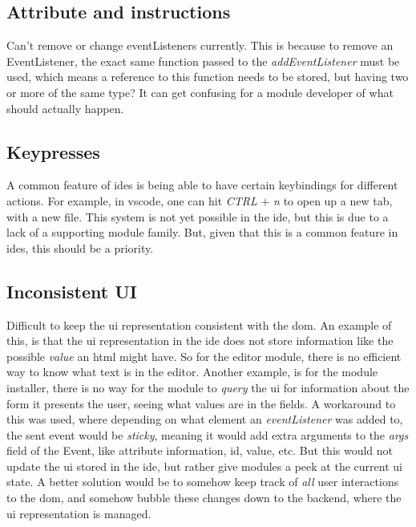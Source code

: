 \subsection{Attribute and instructions}

Can't remove or change eventListeners currently. This is because to remove an
EventListener, the exact same function passed to the \textit{addEventListener}
must be used, which means a reference to this function needs to be stored, but
having two or more of the same type? It can get confusing for a module developer
of what should actually happen.

\subsection{Keypresses}

A common feature of \gls*{ide}s is being able to have certain keybindings for
different actions. For example, in \gls*{vscode}, one can hit \textit{CTRL}
$+$ \textit{n} to open up a new tab, with a new file. This system is not yet
possible in the \gls*{ide}, but this is due to a lack of a supporting module
family. But, given that this is a common feature in \gls*{ide}s, this should be
a priority.

\subsection{Inconsistent UI}

Difficult to keep the \gls*{ui} representation consistent with the \gls*{dom}.
An example of this, is that the \gls*{ui} representation in the \gls*{ide} does
not store information like the possible \textit{value} an \gls{html} might
have. So for the editor module, there is no efficient way to know what text is
in the editor. Another example, is for the module installer, there is no way for
the module to \textit{query} the \gls*{ui} for information about the form it
presents the user, seeing what values are in the fields. A workaround to this
was used, where depending on what element an \textit{eventListener} was added
to, the sent event would be \textit{sticky}, meaning it would add extra
arguments to the \textit{args} field of the Event, like attribute information,
id, value, etc. But this would not update the \gls*{ui} stored in the
\gls*{ide}, but rather give modules a peek at the current \gls*{ui} state. A
better solution would be to somehow keep track of \textit{all} user interactions
to the \gls*{dom}, and somehow bubble these changes down to the backend, where
the \gls*{ui} representation is managed.

